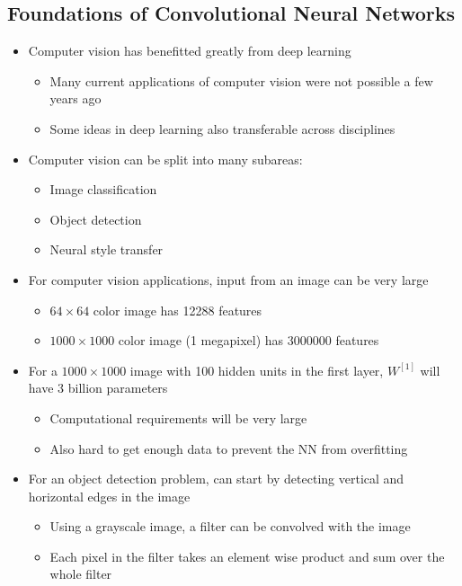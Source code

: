 \documentclass[12pt, letterpaper]{article}
\begin{document}
    \subsection{Foundations of Convolutional Neural Networks}
    \begin{itemize}
        \item Computer vision has benefitted greatly from deep learning
        \begin{itemize}
            \item Many current applications of computer vision were not possible a few years ago
            \item Some ideas in deep learning also transferable across disciplines
        \end{itemize}
        \item Computer vision can be split into many subareas:
        \begin{itemize}
            \item Image classification
            \item Object detection
            \item Neural style transfer
        \end{itemize}
        \item For computer vision applications, input from an image can be very large
        \begin{itemize}
            \item $64\times64$ color image has 12288 features
            \item $1000\times1000$ color image (1 megapixel) has 3000000 features
        \end{itemize}
        \item For a $1000\times1000$ image with 100 hidden units in the first layer, $W^{[1]}$ will have 3 billion parameters
        \begin{itemize}
            \item Computational requirements will be very large
            \item Also hard to get enough data to prevent the NN from overfitting
        \end{itemize}
        \item For an object detection problem, can start by detecting vertical and horizontal edges in the image
        \begin{itemize}
            \item Using a grayscale image, a filter can be convolved with the image 
            \item Each pixel in the filter takes an element wise product and sum over the whole filter

\end{itemize}
\end{itemize}
\end{document}
